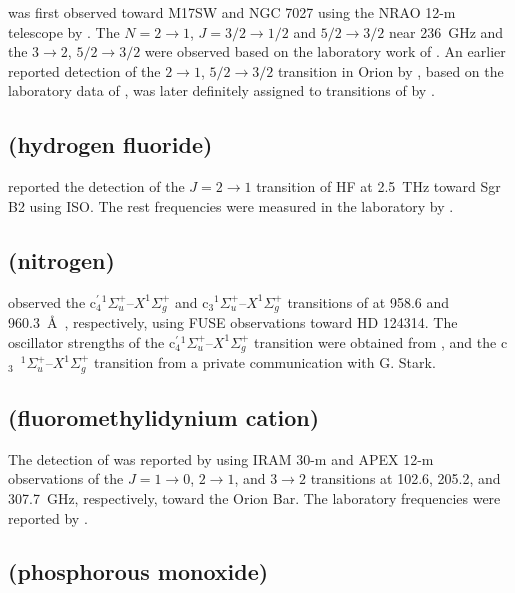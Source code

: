 \documentclass[twocolumn]{aastex631}
\begin{document}
     was first observed toward M17SW and NGC 7027 using the NRAO 12-m telescope by \citet{Latter:1993nb}. The $N=2\rightarrow1$, $J = 3/2\rightarrow1/2$ and $5/2\rightarrow3/2$ near 236~GHz and the $3\rightarrow2$, $5/2\rightarrow3/2$ were observed based on the laboratory work of \citet{Sastry:1981lk}. An earlier reported detection of the $2\rightarrow1$, $5/2\rightarrow3/2$ transition in Orion by \citet{Erickson:1981bn}, based on the laboratory data of \citet{Dixon:1975iw}, was later definitely assigned to transitions of  by \citet{Blake:1984mk}.  
    
    \subsection{ (hydrogen fluoride)}
    \label{HF}
    
    \citet{Neufeld:1997td} reported the detection of the $J = 2\rightarrow1$ transition of HF at 2.5~THz toward Sgr B2 using ISO.  The rest frequencies were measured in the laboratory by \citet{Nolt:1987gd}.
    
    \subsection{ (nitrogen)}
    \label{N2}
    
    \citet{Knauth:2004vp} observed the c$^{\prime}_4$$^1$$\Sigma_u^+$--$X^1$$\Sigma_g^+$ and c$_3$$^1$$\Sigma_u^+$--$X^1$$\Sigma_g^+$ transitions of  at 958.6 and 960.3~\AA~, respectively, using FUSE observations toward HD 124314.  The oscillator strengths of the c$^{\prime}_4$$^1 $$\Sigma_u^+$--$X^1\Sigma_g^+$ transition were obtained from \citet{Stark:2000fe}, and the c$_3$~$^1$$ \Sigma_u^+$--$X^1$$\Sigma_g^+$ transition from a private communication with G. Stark.
    
    \subsection{ (fluoromethylidynium cation)}
    \label{CF+}
    
    The detection of  was reported by \citet{Neufeld:2006ej} using IRAM 30-m and APEX 12-m observations of the $J = 1\rightarrow0$, $2\rightarrow1$, and $3\rightarrow2$ transitions at 102.6, 205.2, and 307.7~GHz, respectively, toward the Orion Bar.  The laboratory frequencies were reported by \citet{Plummer:1986jn}.
    
    \subsection{ (phosphorous monoxide)}
    \label{PO}
    
\end{document}
